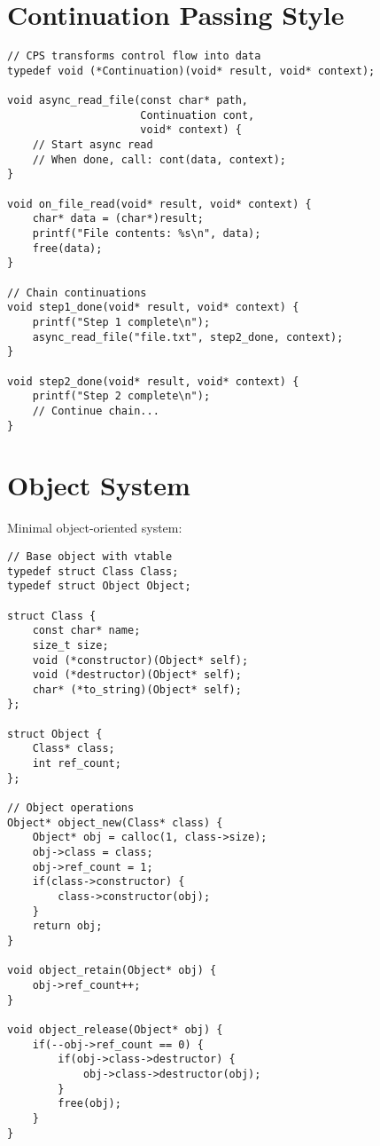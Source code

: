 \begin{description}[style=nextline,leftmargin=0pt]
\section{Continuation Passing Style}

\begin{lstlisting}
// CPS transforms control flow into data
typedef void (*Continuation)(void* result, void* context);

void async_read_file(const char* path,
                     Continuation cont,
                     void* context) {
    // Start async read
    // When done, call: cont(data, context);
}

void on_file_read(void* result, void* context) {
    char* data = (char*)result;
    printf("File contents: %s\n", data);
    free(data);
}

// Chain continuations
void step1_done(void* result, void* context) {
    printf("Step 1 complete\n");
    async_read_file("file.txt", step2_done, context);
}

void step2_done(void* result, void* context) {
    printf("Step 2 complete\n");
    // Continue chain...
}
\end{lstlisting}

\section{Object System}

Minimal object-oriented system:

\begin{lstlisting}
// Base object with vtable
typedef struct Class Class;
typedef struct Object Object;

struct Class {
    const char* name;
    size_t size;
    void (*constructor)(Object* self);
    void (*destructor)(Object* self);
    char* (*to_string)(Object* self);
};

struct Object {
    Class* class;
    int ref_count;
};

// Object operations
Object* object_new(Class* class) {
    Object* obj = calloc(1, class->size);
    obj->class = class;
    obj->ref_count = 1;
    if(class->constructor) {
        class->constructor(obj);
    }
    return obj;
}

void object_retain(Object* obj) {
    obj->ref_count++;
}

void object_release(Object* obj) {
    if(--obj->ref_count == 0) {
        if(obj->class->destructor) {
            obj->class->destructor(obj);
        }
        free(obj);
    }
}


\end{lstlisting}
\end{description}
